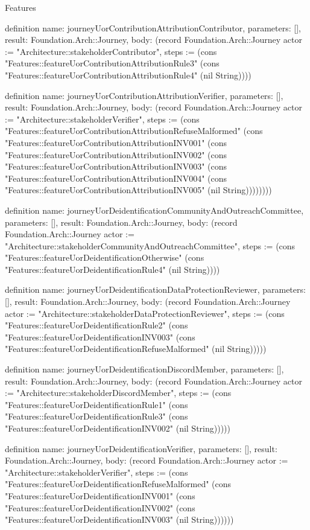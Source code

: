 \begin{lexlean}{Features}
\begin{semanticmodule}
definition{
  name: journeyUorContributionAttributionContributor,
  parameters: [],
  result: Foundation.Arch::Journey,
  body: (record Foundation.Arch::Journey {actor := "Architecture::stakeholderContributor", steps := (cons "Features::featureUorContributionAttributionRule3" (cons "Features::featureUorContributionAttributionRule4" (nil String)))})
}

definition{
  name: journeyUorContributionAttributionVerifier,
  parameters: [],
  result: Foundation.Arch::Journey,
  body: (record Foundation.Arch::Journey {actor := "Architecture::stakeholderVerifier", steps := (cons "Features::featureUorContributionAttributionRefuseMalformed" (cons "Features::featureUorContributionAttributionINV001" (cons "Features::featureUorContributionAttributionINV002" (cons "Features::featureUorContributionAttributionINV003" (cons "Features::featureUorContributionAttributionINV004" (cons "Features::featureUorContributionAttributionINV005" (nil String)))))))})
}

definition{
  name: journeyUorDeidentificationCommunityAndOutreachCommittee,
  parameters: [],
  result: Foundation.Arch::Journey,
  body: (record Foundation.Arch::Journey {actor := "Architecture::stakeholderCommunityAndOutreachCommittee", steps := (cons "Features::featureUorDeidentificationOtherwise" (cons "Features::featureUorDeidentificationRule4" (nil String)))})
}

definition{
  name: journeyUorDeidentificationDataProtectionReviewer,
  parameters: [],
  result: Foundation.Arch::Journey,
  body: (record Foundation.Arch::Journey {actor := "Architecture::stakeholderDataProtectionReviewer", steps := (cons "Features::featureUorDeidentificationRule2" (cons "Features::featureUorDeidentificationINV003" (cons "Features::featureUorDeidentificationRefuseMalformed" (nil String))))})
}

definition{
  name: journeyUorDeidentificationDiscordMember,
  parameters: [],
  result: Foundation.Arch::Journey,
  body: (record Foundation.Arch::Journey {actor := "Architecture::stakeholderDiscordMember", steps := (cons "Features::featureUorDeidentificationRule1" (cons "Features::featureUorDeidentificationRule3" (cons "Features::featureUorDeidentificationINV002" (nil String))))})
}

definition{
  name: journeyUorDeidentificationVerifier,
  parameters: [],
  result: Foundation.Arch::Journey,
  body: (record Foundation.Arch::Journey {actor := "Architecture::stakeholderVerifier", steps := (cons "Features::featureUorDeidentificationRefuseMalformed" (cons "Features::featureUorDeidentificationINV001" (cons "Features::featureUorDeidentificationINV002" (cons "Features::featureUorDeidentificationINV003" (nil String)))))})
}


\end{semanticmodule}
\end{lexlean}
